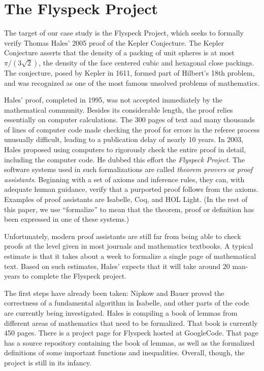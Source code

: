 
\section{The Flyspeck Project}
\label{sec:flyspeck}

%
The target of our case study is the Flyspeck Project, which seeks
to formally verify Thomas Hales' 2005 proof of the Kepler Conjecture.  
The Kepler Conjecture asserts that the density of a packing of unit spheres
is at most $\pi/(3\sqrt{2})$, the density of the face centered cubic and 
hexagonal close packings.  The conjecture, posed by Kepler in 1611, formed part
of Hilbert's 18th problem, and was recognized as one of the most famous unsolved
problems of mathematics.    

  Hales' proof, completed in 1995, was not accepted immediately by the mathematical community. 
Besides its considerable length,  the proof relies essentially on computer calculations.  
The 300 pages of text and many thousands of lines of computer code made
checking the proof for errors in the referee process unusually difficult,
leading to a publication delay of nearly 10 years.  
In 2003, Hales proposed using computers to rigorously check the entire proof in
detail, including the computer code.  He dubbed this
effort the \textit{Flyspeck Project}.  
The software systems used in such formalizations are called \textit{theorem provers}
or \textit{proof assistants}.
Beginning with a set of axioms and inference rules, they can,
with adequate human guidance, verify that a purported proof follows from the axioms.  
Examples of proof assistants are Isabelle\cite{Paulson:1994:Isabelle}, 
Coq\cite{Bertot:2004:CoqBook}, 
and HOL Light\cite{Harrison:2000:HOL-Light}. (In the rest of this paper, we use ``formalize'' to mean
that the theorem, proof or definition has been expressed in one of these systems.) 

  Unfortunately, modern proof assistants are still far from being able to check
proofs at the level given in most journals and mathematics textbooks.  A typical
estimate is that it takes about a week to formalize a single page of mathematical
text.  Based on such estimates, Hales' expects that it will take 
around 20 man-years to complete the Flyspeck project.  

The first steps have already been taken:  Nipkow and
Bauer\cite{Nipkow:2005:Tame} proved the correctness of a 
fundamental algorithm in Isabelle, and other parts of the code are
currently being investigated.  Hales is compiling a book\cite{Hales:2007:FlyspeckBook}
of lemmas from different areas of mathematics that need to be formalized.    
That book is currently 450 pages.  
There is a project page\cite{website:FlyspeckProjectPage}
for Flyspeck hosted at GoogleCode\cite{website:GoogleCode}.  That page has a source repository
containing the book of lemmas, as well as the formalized definitions of some important functions
and inequalities.  Overall, though, the project is still in its infancy.
